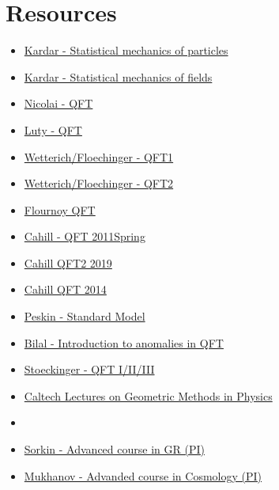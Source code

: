 \documentclass[10pt,a4paper]{book}
\theoremstyle{definition}
\begin{document}
\chapter{Resources}
\begin{itemize}


\item \href{https://ocw.mit.edu/courses/8-333-statistical-mechanics-i-statistical-mechanics-of-particles-fall-2013/video_galleries/video-lectures/}{Kardar - Statistical mechanics of particles}
\item \href{https://ocw.mit.edu/courses/8-334-statistical-mechanics-ii-statistical-physics-of-fields-spring-2014/video_galleries/video-lectures/}{Kardar - Statistical mechanics of fields}

\item \href{https://www.youtube.com/watch?v=seabT438nr0}{Nicolai - QFT}
\item \href{https://www.youtube.com/watch?v=EzfFklLqDjA&t=791s}{Luty - QFT}
\item \href{https://www.tpi.uni-jena.de/~floerchinger/qft1/Lecture01/}{Wetterich/Floechinger - QFT1}
\item \href{https://www.tpi.uni-jena.de/~floerchinger/qft2/lecture01/}{Wetterich/Floechinger - QFT2}
\item \href{https://www.youtube.com/@AlexFlournoyTeacher}{Flournoy QFT}
\item \href{https://www.youtube.com/watch?v=MqG-F6CV7qk&list=PLB6035BED574535DC}{Cahill - QFT 2011Spring}
\item \href{https://www.youtube.com/watch?v=Z4gC4ezAG0Y&list=PLpyIij4nP6QLfC2CsDF8CHzK6HkEkWCze}{Cahill QFT2 2019}
\item \href{https://www.youtube.com/playlist?list=PLpyIij4nP6QKgoKhAWKHZFHrvkFHsFZym}{Cahill QFT 2014}
\item \href{https://www.youtube.com/watch?v=0LWYXkeuy-Q}{Peskin - Standard Model}
\item \href{https://www.youtube.com/watch?v=Q3cHDiZIG44}{Bilal - Introduction to anomalies in QFT}
\item \href{https://www.youtube.com/@qftdominikstoeckinger1285/playlists}{Stoeckinger - QFT I/II/III}

\item \href{https://www.youtube.com/playlist?list=PLAMDKMENB2xBOucbrZWja2Rs-SdqH7KIX}{Caltech Lectures on Geometric Methods in Physics}
\item \href{}{}

\item \href{https://www.youtube.com/watch?v=5IDHkKwXK4Y&list=PLaNkJORnlhZlAeFDKvWuoyqBBLPZ0F-3X}{Sorkin - Advanced course in GR (PI)}
\item \href{https://www.youtube.com/watch?v=IPxnAw91bMM&list=PLaNkJORnlhZkrH4w1AXqx4c4KNjJgh2rB}{Mukhanov - Advanded course in Cosmology (PI)}


\end{itemize}
\end{document}
